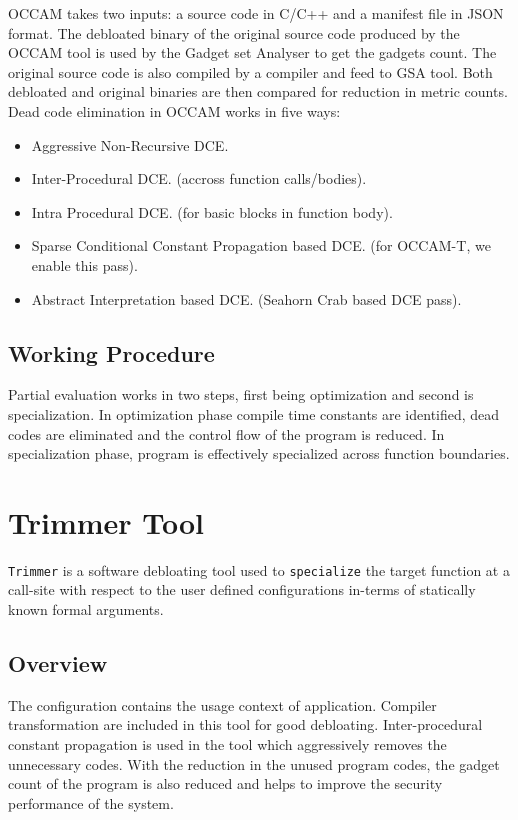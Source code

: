\documentclass{relatorio}
\begin{document}
OCCAM takes two inputs: a source code in C/C++ and a manifest file in JSON format. The debloated binary of the original source code produced by the OCCAM tool 
is used by the Gadget set Analyser to get the gadgets count. The original source code is also compiled by a compiler and feed to GSA tool. Both debloated and original binaries are then compared for reduction in metric counts. Dead code elimination in OCCAM works in five ways:

\begin{itemize}
	\item Aggressive Non-Recursive DCE.
	\item Inter-Procedural DCE.
(accross function calls/bodies).
	\item Intra Procedural DCE.
(for basic blocks in function body).
	\item Sparse Conditional Constant Propagation based DCE.
(for OCCAM-T, we enable this pass).
	\item Abstract Interpretation based DCE. (Seahorn Crab based DCE pass).
\end{itemize}

\subsection{Working Procedure}%
Partial evaluation works in two steps, first being optimization and second is specialization.
In optimization phase compile time constants are identified, dead codes are eliminated and the control flow of the program is reduced. In specialization phase, program is effectively specialized across function boundaries.

\section{Trimmer Tool}%

\texttt{Trimmer} is a software debloating tool used to \texttt{specialize} the target function at a call-site with respect to the user defined configurations in-terms of statically known formal arguments.

\subsection{Overview}%
\label{Tools}

The configuration contains the usage context of application. Compiler transformation are included in this tool for good debloating. Inter-procedural constant propagation is used in the tool which aggressively removes the unnecessary codes. With the reduction in the unused program codes, the gadget count of the program is also reduced and helps to improve the security performance of the system. 
\end{document}
